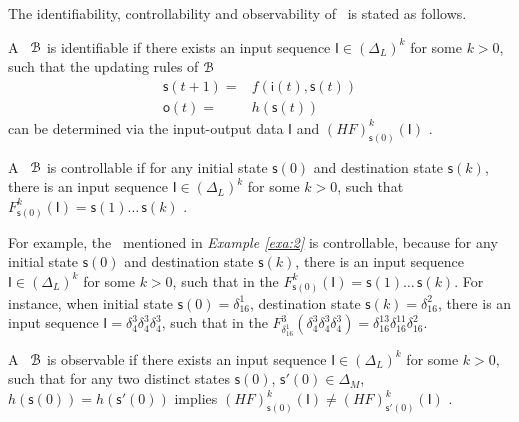 The identifiability, controllability and observability of \BCNs\ is stated as follows. 
\begin{definition}[Identifiability]%
	A \BCN\ ${\mathcal{B}}$ is identifiable if there exists an input sequence $\mathsf{I}\in(\Delta_L)^k$ for some $k>0$, such that the updating rules of ${\mathcal{B}}$
	\begin{equation*}
    		\begin{split}
		\mathsf{s}(t+1)=&f(\mathsf{i}(t),\mathsf{s}(t))\\
		\mathsf{o}(t)=&h(\mathsf{s}(t))
		\end{split}
	\end{equation*}
	can be determined via the input-output data $\mathsf{I}$ and $(HF)^k_{\mathsf{s}(0)}(\mathsf{I})$ \cite{Cheng2011Identification}.
\end{definition}

\begin{definition}[Controllability]
	A \BCN\ ${\mathcal{B}}$ is controllable if for any initial state $\mathsf{s}(0)$ and destination state $\mathsf{s}(k)$, there is an input sequence $\mathsf{I}\in(\Delta_L)^k$ for some $k>0$, such that $F^k_{\mathsf{s}(0)}(\mathsf{I})=\mathsf{s}(1) \ldots\, \mathsf{s}(k)$ \cite{cheng2009controllability}.
\end{definition}

\begin{example}
For example, the \BCN\ mentioned in {\em Example \ref{exa:2}} is controllable, because for any initial state $\mathsf{s}(0)$ and destination state $\mathsf{s}(k)$, there is an input sequence $\mathsf{I}\in(\Delta_L)^k$ for some $k>0$, such that in the $F^k_{\mathsf{s}(0)}(\mathsf{I})=\mathsf{s}(1) \ldots\, \mathsf{s}(k)$. For instance, when initial state $\mathsf{s}(0)= \delta_{16}^{1}$, destination state $\mathsf{s}(k)=\delta_{16}^{2}$, there is an input sequence $\mathsf{I}=\delta_{4}^{3}\delta_{4}^{3}\delta_{4}^{3}$, such that in the $F^3_{\delta_{16}^{1}}(\delta_{4}^{3}\delta_{4}^{3}\delta_{4}^{3})=\delta_{16}^{13}\delta_{16}^{11}\delta_{16}^{2}$.
\label{exa:12}
\end{example}  

\begin{definition}[Observability]
A \BCN\ ${\mathcal{B}}$ is observable if there exists an input sequence $\mathsf{I}\in(\Delta_L)^k$ for some $k>0$, such that for any two distinct states $\mathsf{s}(0)$, $\mathsf{s}'(0) \in \Delta_M$, $h(\mathsf{s}(0))=h(\mathsf{s}'(0))$ implies $(HF)^k_{\mathsf{s}(0)}(\mathsf{I})\neq (HF)^k_{\mathsf{s}'(0)}(\mathsf{I})$ \cite{Cheng2011Identification}.
\end{definition}

